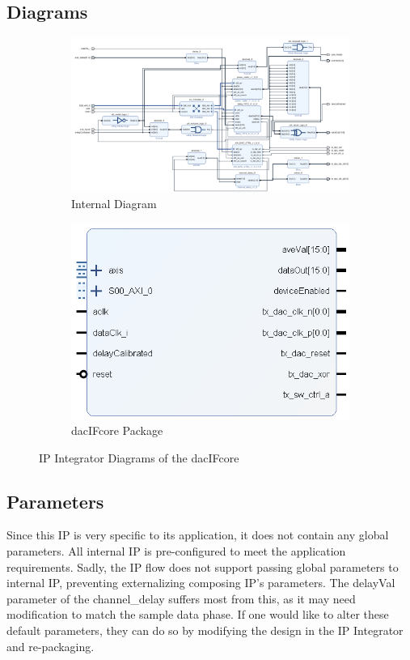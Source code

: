 \documentclass[11pt]{article}
\begin{document}
\subsection{Diagrams}
\begin{figure}[H]
	\centering
	\begin{subfigure}[b]{\linewidth}
		\includegraphics[width=\linewidth]{images/dac_IF_core_internal}
		\caption{Internal Diagram}
	\end{subfigure}
	\begin{subfigure}[b]{0.4\linewidth}
		\includegraphics[width=\linewidth]{images/dac_IF_core}
		\caption{dac\textunderscore IF\textunderscore core Package}
	\end{subfigure}
	\caption{IP Integrator Diagrams of the dac\textunderscore IF\textunderscore core}
\end{figure}
\subsection{Parameters}
Since this IP is very specific to its application, it does not contain any global parameters. All internal IP is pre-configured to meet the application
requirements. Sadly, the IP flow does not support passing global parameters to internal IP, preventing externalizing composing IP's parameters. The 
delayVal parameter of the channel\_delay suffers most from this, as it may need modification to match the sample data phase. If one would like to alter
these default parameters, they can do so by modifying the design in the IP Integrator and re-packaging.
\end{document}
